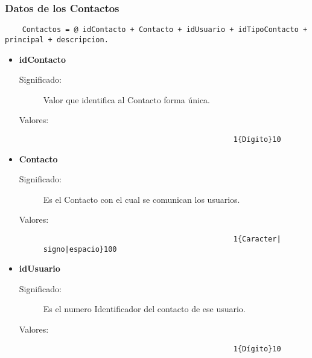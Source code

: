 \subsubsection{Datos de los Contactos}
\begin{lstlisting}
	Contactos = @ idContacto + Contacto + idUsuario + idTipoContacto + principal + descripcion.
\end{lstlisting}
\begin{itemize}
	\item	\textbf{idContacto}
		\begin{description}
			\item [Significado:] Valor que identifica al Contacto forma única.
			\item [Valores:]{\begin{lstlisting}
                                            1{Dígito}10
                                         \end{lstlisting}}
		\end{description}
	
        \item \textbf{Contacto}
		\begin{description}
			\item [Significado:] Es el Contacto con el cual se comunican los usuarios.
			\item [Valores:]{\begin{lstlisting}
                                            1{Caracter| signo|espacio}100
                                         \end{lstlisting}} 
		\end{description}

        \item \textbf{idUsuario}
		\begin{description}
			\item [Significado:] Es el numero Identificador del contacto de ese usuario.
			\item [Valores:]{\begin{lstlisting}
                                            1{Dígito}10
                                         \end{lstlisting}} 
		\end{description}


\end{itemize}
